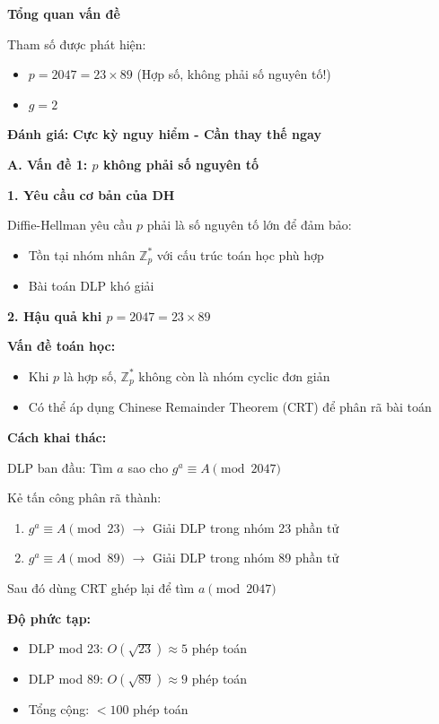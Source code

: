\textbf{Tổng quan vấn đề}

Tham số được phát hiện:
\begin{itemize}
    \item $p = 2047 = 23 \times 89$ (Hợp số, không phải số nguyên tố!)
    \item $g = 2$
\end{itemize}

\textbf{Đánh giá:} \textbf{Cực kỳ nguy hiểm - Cần thay thế ngay}

\textbf{A. Vấn đề 1: $p$ không phải số nguyên tố}

\textbf{1. Yêu cầu cơ bản của DH}

Diffie-Hellman yêu cầu $p$ phải là số nguyên tố lớn để đảm bảo:
\begin{itemize}
    \item Tồn tại nhóm nhân $\mathbb{Z}_p^*$ với cấu trúc toán học phù hợp
    \item Bài toán DLP khó giải
\end{itemize}

\textbf{2. Hậu quả khi $p = 2047 = 23 \times 89$}

\textbf{Vấn đề toán học:}
\begin{itemize}
    \item Khi $p$ là hợp số, $\mathbb{Z}_p^*$ không còn là nhóm cyclic đơn giản
    \item Có thể áp dụng Chinese Remainder Theorem (CRT) để phân rã bài toán
\end{itemize}

\textbf{Cách khai thác:}

DLP ban đầu: Tìm $a$ sao cho $g^a \equiv A \pmod{2047}$

Kẻ tấn công phân rã thành:
\begin{enumerate}
    \item $g^a \equiv A \pmod{23}$ $\rightarrow$ Giải DLP trong nhóm 23 phần tử
    \item $g^a \equiv A \pmod{89}$ $\rightarrow$ Giải DLP trong nhóm 89 phần tử
\end{enumerate}

Sau đó dùng CRT ghép lại để tìm $a \pmod{2047}$

\textbf{Độ phức tạp:}
\begin{itemize}
    \item DLP mod 23: $O(\sqrt{23}) \approx 5$ phép toán
    \item DLP mod 89: $O(\sqrt{89}) \approx 9$ phép toán
    \item Tổng cộng: $< 100$ phép toán
\end{itemize}


